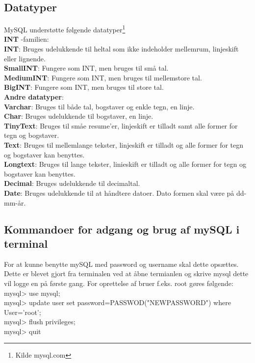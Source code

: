 \subsection*{Datatyper}
MySQL understøtte følgende datatyper\footnote{Kilde mysql.com} \\
\textbf{INT} -familien:\\
\textbf{INT}: Bruges udelukkende til heltal som ikke indeholder mellemrum, linjeskift eller lignende.\\
\textbf{SmallINT}: Fungere som INT, men bruges til små tal.\\
\textbf{MediumINT}: Fungere som INT, men bruges til mellemstore tal.\\
\textbf{BigINT}: Fungere som INT, men bruges til store tal.\\

\textbf{Andre datatyper}:\\
\textbf{Varchar}: Bruges til både tal, bogstaver og enkle tegn, en linje.\\
\textbf{Char}: Bruges udelukkende til bogstaver, en linje.\\
\textbf{TinyText}: Bruges til småe resume'er, linjeskift er tilladt samt alle former for tegn og bogstaver.\\
\textbf{Text}: Bruges til mellemlange  tekster, linjeskift er tilladt og alle former for tegn og bogstaver kan benyttes.\\
\textbf{Longtext}: Bruges til lange tekster, linieskift er tilladt og alle former for tegn og bogstaver kan benyttes.\\
\textbf{Decimal}: Bruges udelukkende til decimaltal.\\
\textbf{Date}: Bruges udelukkende til at håndtere datoer. Dato formen skal være på dd-mm-år.\\

\subsection*{Kommandoer for adgang og brug af mySQL i terminal}
For at kunne benytte mySQL med password og username skal dette opsættes. Dette er blevet gjort fra terminalen ved at åbne termianlen og skrive mysql dette vil logge en på første gang. For oprettelse af bruer f.eks. root gøres følgende:\\
mysql> use mysql;\\
mysql> update user set password=PASSWOD("NEWPASSWORD") where User='root';\\
mysql> flush privileges;\\
mysql> quit

